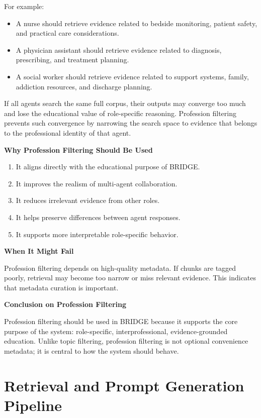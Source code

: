 \documentclass[12pt]{article}
\begin{document}
For example:

\begin{itemize}[leftmargin=1.5em]
    \item A nurse should retrieve evidence related to bedside monitoring, patient safety, and practical care considerations.
    \item A physician assistant should retrieve evidence related to diagnosis, prescribing, and treatment planning.
    \item A social worker should retrieve evidence related to support systems, family, addiction resources, and discharge planning.
\end{itemize}

If all agents search the same full corpus, their outputs may converge too much and lose the educational value of role-specific reasoning. Profession filtering prevents such convergence by narrowing the search space to evidence that belongs to the professional identity of that agent.

\textbf{Why Profession Filtering Should Be Used}

\begin{enumerate}[leftmargin=1.5em]
    \item It aligns directly with the educational purpose of BRIDGE.
    \item It improves the realism of multi-agent collaboration.
    \item It reduces irrelevant evidence from other roles.
    \item It helps preserve differences between agent responses.
    \item It supports more interpretable role-specific behavior.
\end{enumerate}

\textbf{When It Might Fail}

Profession filtering depends on high-quality metadata. If chunks are tagged poorly, retrieval may become too narrow or miss relevant evidence. This indicates that metadata curation is important.

\textbf{Conclusion on Profession Filtering}

Profession filtering should be used in BRIDGE because it supports the core purpose of the system: role-specific, interprofessional, evidence-grounded education. Unlike topic filtering, profession filtering is not optional convenience metadata; it is central to how the system should behave.

\section{Retrieval and Prompt Generation Pipeline}
\end{document}
